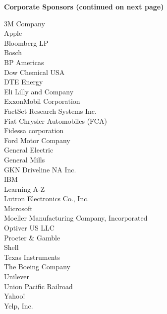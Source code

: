 \documentclass[twoside]{article}
\begin{document}
    { \fontsize{14}{17}\selectfont \bf Corporate Sponsors (continued on next page)}
    \vspace{-1em}\begin{multicols}{2}3M Company\\
        Apple\\
        Bloomberg LP\\
        Bosch\\
        BP Americas\\
        Dow Chemical USA\\
        DTE Energy\\
        Eli Lilly and Company\\
        ExxonMobil Corporation\\
        FactSet Research Systems Inc.\\
        Fiat Chrysler Automobiles (FCA)\\
        Fidessa corporation\\
        Ford Motor Company\\
        General Electric\\
        General Mills\\
        GKN Driveline NA Inc.\\
        IBM\\
        Learning A-Z\\
        Lutron Electronics Co., Inc.\\
        Microsoft\\
        Moeller Manufacturing Company, Incorporated\\
        Optiver US LLC\\
        Procter \& Gamble\\
        Shell\\
        Texas Instruments\\
        The Boeing Company\\
        Unilever\\
        Union Pacific Railroad\\
        Yahoo!\\
        Yelp, Inc.\\
        \end{multicols}
    
\end{document}
